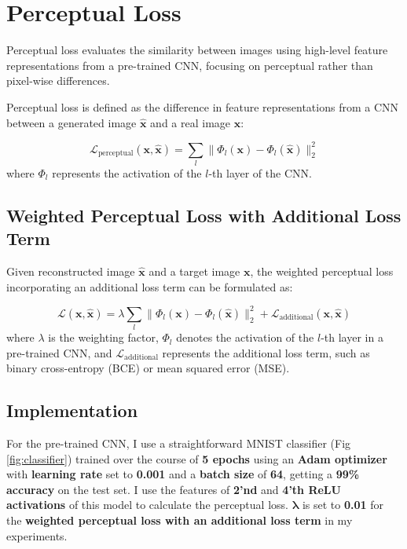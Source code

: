 \documentclass[12pt]{article}
\begin{document}
\section{Perceptual Loss}
Perceptual loss evaluates the similarity between images using high-level feature representations from a pre-trained CNN, focusing on perceptual rather than pixel-wise differences.

Perceptual loss is defined as the difference in feature representations from a CNN between a generated image $\mathbf{\hat{x}}$ and a real image $\mathbf{x}$:

\begin{equation}
\mathcal{L}_{\text{perceptual}}(\mathbf{x}, \mathbf{\hat{x}}) = \sum_{l} \| \Phi_l(\mathbf{x}) - \Phi_l(\mathbf{\hat{x}}) \|_2^2
\end{equation}
where $\Phi_l$ represents the activation of the $l$-th layer of the CNN.

\subsection{Weighted Perceptual Loss with Additional Loss Term}
Given reconstructed image $\mathbf{\hat{x}}$ and a target image $\mathbf{x}$, the weighted perceptual loss incorporating an additional loss term can be formulated as:

\begin{equation}
\mathcal{L}(\mathbf{x}, \mathbf{\hat{x}}) = \lambda \sum_{l} \| \Phi_l(\mathbf{x}) - \Phi_l(\mathbf{\hat{x}}) \|_2^2 + \mathcal{L}_{\text{additional}}(\mathbf{x}, \mathbf{\hat{x}})
\end{equation}
where $\lambda$ is the weighting factor, $\Phi_l$ denotes the activation of the $l$-th layer in a pre-trained CNN, and $\mathcal{L}_{\text{additional}}$ represents the additional loss term, such as binary cross-entropy (BCE) or mean squared error (MSE).

\subsection{Implementation}
For the pre-trained CNN, I use a straightforward MNIST classifier (Fig \ref{fig:classifier}) trained over the course of \textbf{5 epochs} using an \textbf{Adam optimizer} with \textbf{learning rate} set to \textbf{0.001} and a \textbf{batch size} of \textbf{64}, getting a \textbf{99\% accuracy} on the test set. I use the features of \textbf{2'nd} and \textbf{4'th ReLU activations} of this model to calculate the perceptual loss. $\boldsymbol{\lambda}$ is set to \textbf{0.01} for the \textbf{weighted perceptual loss with an additional loss term} in my experiments.
\end{document}
